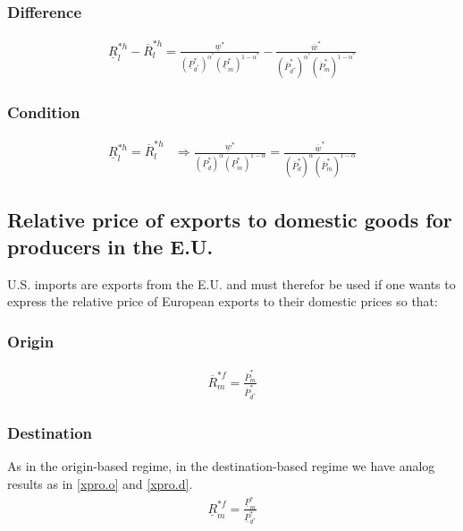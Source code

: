 \subsubsection*{Difference}
\begin{equation}\label{conweu.diff}
\begin{aligned}
\underline R^{*h}_l - \overline R^{*h}_l = \frac{\underline w^*}{ \left( \underline P^*_{d^*} \right) ^{\alpha^*}  \left( \underline P^*_m \right) ^{1-\alpha^*}} - \frac{\overline w^*}{ ( \overline P^*_{d^*}) ^{\alpha^*}  ( \overline P^*_m) ^{1-\alpha^*}}\end{aligned}  \end{equation}

\subsubsection*{Condition}
\begin{equation}\label{conweu.con}
\begin{aligned}
\underline R^{*h}_l = \overline R^{*h}_l &\Rightarrow \frac{\underline w^*}{ \left( \underline P^*_{d} \right) ^{\alpha}  \left( \underline P^*_m \right) ^{1-\alpha}} = \frac{\overline w^*}{ ( \overline P^*_{d}) ^{\alpha}  ( \overline P^*_m ) ^{1-\alpha}}
\end{aligned}  
\end{equation}

\subsection*{Relative price of exports to domestic goods for producers in the E.U.}
U.S. imports are exports from the E.U. and must therefor be used if one wants to express the relative price of European exports to their domestic prices so that:
\subsubsection*{Origin}
\begin{equation}\label{mproeu.o}
\begin{aligned}
\overline R^{*f}_m = \frac{\overline P^*_m}{\overline P^*_{d^*}}\end{aligned}  \end{equation}

\subsubsection*{Destination}
As in the origin-based regime, in the destination-based regime we have analog results as in \eqref{xpro.o} and \eqref{xpro.d}.
\begin{equation}\label{mproeu.o}
\begin{aligned}
\underline R^{*f}_m = \frac{\underline P^*_m}{\underline P^*_{d^*}}\end{aligned}  \end{equation}

